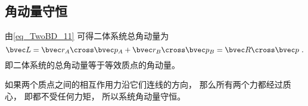 \subsection{角动量守恒}

由\autoref{eq_TwoBD_11} 可得二体系统总角动量为
\begin{equation}
\bvec L = \bvec r_A \cross \bvec p_A + \bvec r_B \cross \bvec p_B
= \bvec R \cross \bvec p~.
\end{equation}
即二体系统的总角动量等于等效质点的角动量。

如果两个质点之间的相互作用力沿它们连线的方向， 那么所有两个力都经过质心， 即都不受任何力矩， 所以系统角动量守恒。
